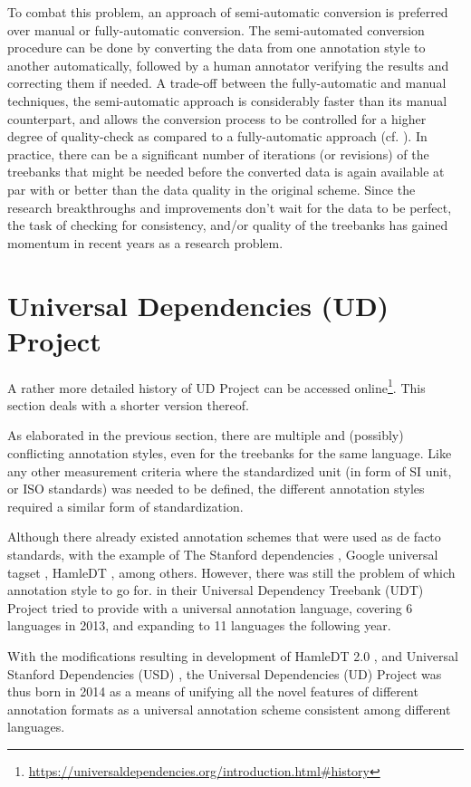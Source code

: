 To combat this problem, an approach of semi-automatic conversion is preferred over manual or fully-automatic conversion. The semi-automated conversion procedure can be done by converting the data from one annotation style to another automatically, followed by a human annotator verifying the results and correcting them if needed. A trade-off between the fully-automatic and manual techniques, the semi-automatic approach is considerably faster than its manual counterpart, and allows the conversion process to be controlled for a higher degree of quality-check as compared to a fully-automatic approach (cf. \cite{preannotation}). In practice, there can be a significant number of iterations (or revisions) of the treebanks that might be needed before the converted data is again available at par with or better than the data quality in the original scheme. Since the research breakthroughs and improvements don't wait for the data to be perfect, the task of checking for consistency, and/or quality of the treebanks has gained momentum in recent years as a research problem.

\section{Universal Dependencies (UD) Project}

A rather more detailed history of UD Project can be accessed online\footnote{\url{https://universaldependencies.org/introduction.html\#history}}. This section deals with a shorter version thereof.

As elaborated in the previous section, there are multiple and (possibly) conflicting annotation styles, even for the treebanks for the same language. Like any other measurement criteria where the standardized unit (in form of SI unit, or ISO standards) was needed to be defined, the different annotation styles required a similar form of standardization.

Although there already existed annotation schemes that were used as de facto standards, with the example of The Stanford dependencies \citep{Standford}, Google universal tagset \citep{google}, HamleDT \citep{HamleDT}, among others. However, there was still the problem of which annotation style to go for. \cite{UDv1} in their Universal Dependency Treebank (UDT) Project tried to provide with a universal annotation language, covering 6 languages in 2013, and expanding to 11 languages the following year.

With the modifications resulting in development of HamleDT 2.0 \citep{HamleDT2}, and Universal Stanford Dependencies (USD) \citep{USD}, the Universal Dependencies (UD) Project was thus born in 2014 as a means of unifying all the novel features of different annotation formats as a universal annotation scheme consistent among different languages.

